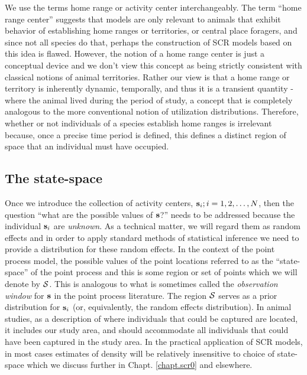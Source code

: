 We use the terms home range or activity center interchangeably. The
term ``home range center'' suggests that models are only relevant to
animals that exhibit behavior of establishing home ranges or
territories, or central place foragers, and since not all species do
that, perhaps the construction of SCR models based on this idea is
flawed. However, the notion of a home range center is just a
conceptual device and we don't view this concept as being strictly
consistent with classical notions of animal territories. Rather our
view is that a home range or territory is inherently dynamic,
temporally, and thus it is a transient quantity - where the animal
lived during the period of study, a concept that is completely
analogous to the more conventional notion of utilization
distributions.  Therefore, whether or not individuals of a species
establish home ranges is irrelevant because, once a precise time
period is defined, this defines a distinct region of space that an
individual must have occupied.



\subsection{The state-space}

Once we introduce the collection of activity centers, ${\bf s}_{i};
i=1,2,\ldots,N$, then the question ``what are the possible values of
${\bf s}$?'' needs to be addressed because the individual ${\bf
  s}_{i}$ are {\it unknown}. As a technical matter, we will regard
them as random effects and in order to apply standard methods of
statistical inference we need to provide a distribution for these
random effects.  In the context of the point process model, the
possible values of the point locations referred to as the
``state-space'' of the point process and this is some region or set of
points which we will denote by ${\cal S}$. This is analogous to what
is sometimes called the {\it observation window} for ${\bf s}$ in the
point process literature.  The region ${\cal S}$ serves as a prior
distribution for ${\bf s}_{i}$ (or, equivalently, the random effects
distribution).
In animal studies, as a description of where individuals that could be
captured are located, it includes our study area, and should
accommodate all individuals that could have been captured in the study
area.  In the practical application of SCR models, in most cases
estimates of density will be relatively insensitive to choice of
state-space which we discuss further in Chapt. \ref{chapt.scr0} and
elsewhere.


